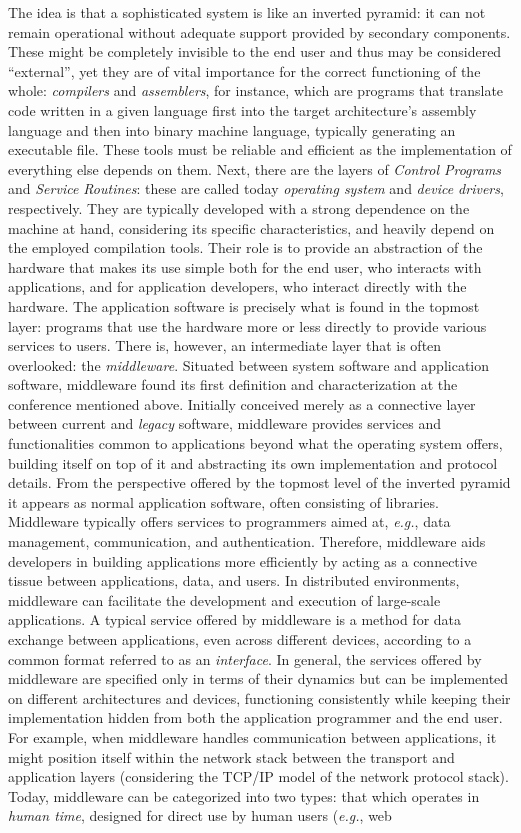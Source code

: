 The idea is that a sophisticated system is like an inverted pyramid: it can not remain operational without adequate support provided by secondary components. These might be completely invisible to the end user and thus may be considered ``external'', yet they are of vital importance for the correct functioning of the whole: \emph{compilers} and \emph{assemblers}, for instance, which are programs that translate code written in a given language first into the target architecture's assembly language and then into binary machine language, typically generating an executable file. These tools must be reliable and efficient as the implementation of everything else depends on them. Next, there are the layers of \emph{Control Programs} and \emph{Service Routines}: these are called today \emph{operating system} and \emph{device drivers}, respectively. They are typically developed with a strong dependence on the machine at hand, considering its specific characteristics, and heavily depend on the employed compilation tools. Their role is to provide an abstraction of the hardware that makes its use simple both for the end user, who interacts with applications, and for application developers, who interact directly with the hardware. The application software is precisely what is found in the topmost layer: programs that use the hardware more or less directly to provide various services to users. There is, however, an intermediate layer that is often overlooked: the \emph{middleware}. Situated between system software and application software, middleware found its first definition and characterization at the conference mentioned above. Initially conceived merely as a connective layer between current and \emph{legacy} software, middleware provides services and functionalities common to applications beyond what the operating system offers, building itself on top of it and abstracting its own implementation and protocol details. From the perspective offered by the topmost level of the inverted pyramid it appears as normal application software, often consisting of libraries. Middleware typically offers services to programmers aimed at, \emph{e.g.}, data management, communication, and authentication. Therefore, middleware aids developers in building applications more efficiently by acting as a connective tissue between applications, data, and users. In distributed environments, middleware can facilitate the development and execution of large-scale applications. A typical service offered by middleware is a method for data exchange between applications, even across different devices, according to a common format referred to as an \emph{interface}. In general, the services offered by middleware are specified only in terms of their dynamics but can be implemented on different architectures and devices, functioning consistently while keeping their implementation hidden from both the application programmer and the end user. For example, when middleware handles communication between applications, it might position itself within the network stack between the transport and application layers (considering the TCP/IP model of the network protocol stack). Today, middleware can be categorized into two types: that which operates in \emph{human time}, designed for direct use by human users (\emph{e.g.}, web 
